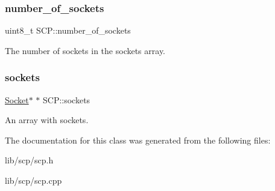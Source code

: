 \subsubsection{\texorpdfstring{number\+\_\+of\+\_\+sockets}{number\_of\_sockets}}
{\footnotesize\ttfamily uint8\+\_\+t S\+C\+P\+::number\+\_\+of\+\_\+sockets\hspace{0.3cm}{\ttfamily [private]}}

The number of sockets in the sockets array. \hypertarget{class_s_c_p_a47df7b56ee4f566f9a59198eaf8e52e7}{}\label{class_s_c_p_a47df7b56ee4f566f9a59198eaf8e52e7} 
\subsubsection{\texorpdfstring{sockets}{sockets}}
{\footnotesize\ttfamily \hyperlink{class_socket}{Socket}$\ast$ $\ast$ S\+C\+P\+::sockets\hspace{0.3cm}{\ttfamily [private]}}

An array with sockets. 

The documentation for this class was generated from the following files\+:\begin{DoxyCompactItemize}
\item 
lib/scp/scp.\+h\item 
lib/scp/scp.\+cpp\end{DoxyCompactItemize}
